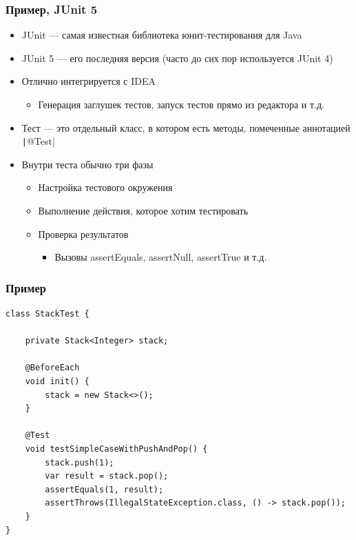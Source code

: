 \documentclass[xetex,mathserif,serif]{beamer}
\begin{document}
	\begin{frame}
		\frametitle{Пример, JUnit 5}
		\begin{itemize}
			\item JUnit --- самая известная библиотека юнит-тестирования для Java
			\item JUnit 5 --- его последняя версия (часто до сих пор используется JUnit 4)
			\item Отлично интегрируется с IDEA
			\begin{itemize}
				\item Генерация заглушек тестов, запуск тестов прямо из редактора и т.д.
			\end{itemize}
			\item Тест --- это отдельный класс, в котором есть методы, помеченные аннотацией \texttt|@Test|
			\item Внутри теста обычно три фазы
			\begin{itemize}
				\item Настройка тестового окружения
				\item Выполнение действия, которое хотим тестировать
				\item Проверка результатов
				\begin{itemize}
					\item Вызовы assertEquals, assertNull, assertTrue и т.д.
				\end{itemize}
			\end{itemize}
		\end{itemize}
	\end{frame}

	\begin{frame}[fragile]
		\frametitle{Пример}
		\begin{small}
			\begin{verbatim}
class StackTest {

    private Stack<Integer> stack;

    @BeforeEach
    void init() {
        stack = new Stack<>();
    }

    @Test
    void testSimpleCaseWithPushAndPop() {
        stack.push(1);
        var result = stack.pop();
        assertEquals(1, result);
        assertThrows(IllegalStateException.class, () -> stack.pop());
    }
}
			\end{verbatim}
		\end{small}
	\end{frame}
\end{document}
